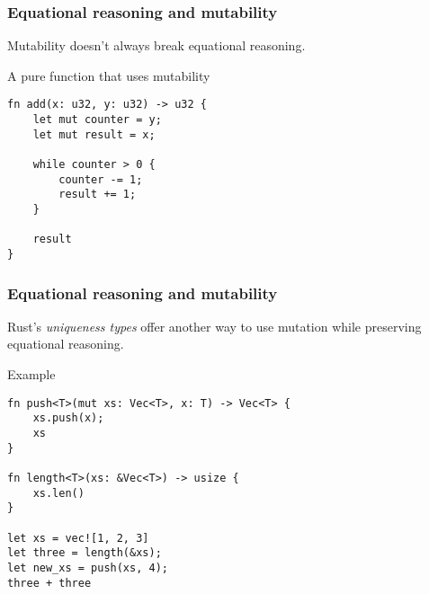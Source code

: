 \documentclass[t]{beamer}
\begin{document}
\begin{frame}[fragile]
\frametitle{Equational reasoning and mutability}

Mutability doesn't always break equational reasoning.

\begin{block}{A pure function that uses mutability}
\begin{verbatim}
fn add(x: u32, y: u32) -> u32 {
    let mut counter = y;
    let mut result = x;
    
    while counter > 0 {
        counter -= 1;
        result += 1;
    }
    
    result
}
\end{verbatim}
\end{block}

\end{frame}


\begin{frame}[fragile]
\frametitle{Equational reasoning and mutability}
Rust's \emph{uniqueness types} offer another way to use mutation while
preserving equational reasoning.

\begin{block}{Example}
\begin{verbatim}
fn push<T>(mut xs: Vec<T>, x: T) -> Vec<T> {
    xs.push(x);
    xs
}

fn length<T>(xs: &Vec<T>) -> usize {
    xs.len()
}

let xs = vec![1, 2, 3]
let three = length(&xs);
let new_xs = push(xs, 4);
three + three
\end{verbatim}
\end{block}

\end{frame}
\end{document}
